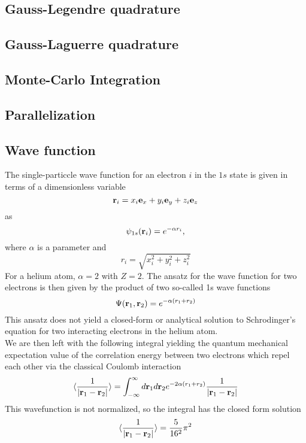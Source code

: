 \documentclass[%
reprint,
amsmath,amssymb,
aps,
]{revtex4-1}
\begin{document}
\subsection{Gauss-Legendre quadrature}
\subsection{Gauss-Laguerre quadrature}
\subsection{Monte-Carlo Integration}
\subsection{Parallelization}

\subsection{Wave function} \noindent 
The single-particcle wave function for an electron $i$ in the $1s$ state is given in terms of a dimensionless variable 
\begin{equation*}
	 {\bf r}_i =  x_i {\bf e}_x + y_i {\bf e}_y +z_i {\bf e}_z 
\end{equation*}
as 
\begin{equation*}
	\psi_{1s}({\bf r}_i)  =   e^{-\alpha r_i},
\end{equation*}
where $\alpha$ is a parameter and 
\begin{equation*}
	r_i = \sqrt{x_i^2+y_i^2+z_i^2}
\end{equation*}
For a helium atom, $\alpha = 2$ with $Z = 2$. The ansatz for the wave function for two electrons is then given by the product of two so-called 1s wave functions
\begin{equation*}
	\Psi({\bf r}_1,{\bf r}_2)  =   e^{-\alpha (r_1+r_2)}
\end{equation*}
This ansatz does not yield a closed-form or analytical solution to Schrodinger's equation for two interacting electrons in the helium atom. \\
We are then left with the following integral yielding the quantum mechanical expectation value of the correlation energy between two electrons which repel each other via the classical Coulomb interaction
\begin{equation}
	   \langle \frac{1}{|{\bf r}_1-{\bf r}_2|} \rangle =
	\int_{-\infty}^{\infty} d{\bf r}_1d{\bf r}_2  e^{-2\alpha (r_1+r_2)}\frac{1}{|{\bf r}_1-{\bf r}_2|}
\end{equation}
This wavefunction is not normalized, so the integral has the closed form solution 
\begin{equation}
\langle \frac{1}{|{\bf r}_1-{\bf r}_2|} \rangle = \dfrac{5}{16^2}\pi^2
\end{equation}
\end{document}
